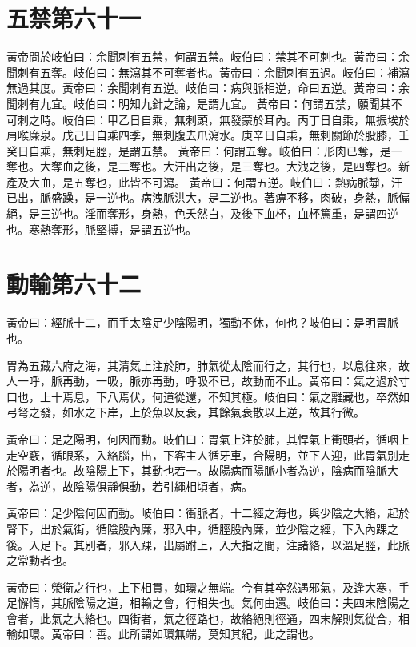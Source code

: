\section{五禁第六十一}

黃帝問於岐伯曰：余聞刺有五禁，何謂五禁。岐伯曰：禁其不可刺也。黃帝曰：余聞刺有五奪。岐伯曰：無瀉其不可奪者也。黃帝曰：余聞刺有五過。岐伯曰：補瀉無過其度。黃帝曰：余聞刺有五逆。岐伯曰：病與脈相逆，命曰五逆。黃帝曰：余聞刺有九宜。岐伯曰：明知九針之論，是謂九宜。
黃帝曰：何謂五禁，願聞其不可刺之時。岐伯曰：甲乙日自乘，無刺頭，無發蒙於耳內。丙丁日自乘，無振埃於肩喉廉泉。戊己日自乘四季，無刺腹去爪瀉水。庚辛日自乘，無刺關節於股膝，壬癸日自乘，無刺足脛，是謂五禁。
黃帝曰：何謂五奪。岐伯曰：形肉已奪，是一奪也。大奪血之後，是二奪也。大汗出之後，是三奪也。大洩之後，是四奪也。新產及大血，是五奪也，此皆不可瀉。
黃帝曰：何謂五逆。岐伯曰：熱病脈靜，汗已出，脈盛躁，是一逆也。病洩脈洪大，是二逆也。著痹不移，肉破，身熱，脈偏絕，是三逆也。淫而奪形，身熱，色夭然白，及後下血杯，血杯篤重，是謂四逆也。寒熱奪形，脈堅搏，是謂五逆也。

\section{動輸第六十二}

黃帝曰：經脈十二，而手太陰足少陰陽明，獨動不休，何也？岐伯曰：是明胃脈也。

胃為五藏六府之海，其清氣上注於肺，肺氣從太陰而行之，其行也，以息往來，故人一呼，脈再動，一吸，脈亦再動，呼吸不已，故動而不止。黃帝曰：氣之過於寸口也，上十焉息，下八焉伏，何道從還，不知其極。岐伯曰：氣之離藏也，卒然如弓弩之發，如水之下岸，上於魚以反衰，其餘氣衰散以上逆，故其行微。

黃帝曰：足之陽明，何因而動。岐伯曰：胃氣上注於肺，其悍氣上衝頭者，循咽上走空竅，循眼系，入絡腦，出，下客主人循牙車，合陽明，並下人迎，此胃氣別走於陽明者也。故陰陽上下，其動也若一。故陽病而陽脈小者為逆，陰病而陰脈大者，為逆，故陰陽俱靜俱動，若引繩相頃者，病。

黃帝曰：足少陰何因而動。岐伯曰：衝脈者，十二經之海也，與少陰之大絡，起於腎下，出於氣街，循陰股內廉，邪入中，循脛股內廉，並少陰之經，下入內踝之後。入足下。其別者，邪入踝，出屬跗上，入大指之間，注諸絡，以溫足脛，此脈之常動者也。

黃帝曰：滎衛之行也，上下相貫，如環之無端。今有其卒然遇邪氣，及逢大寒，手足懈惰，其脈陰陽之道，相輸之會，行相失也。氣何由還。岐伯曰：夫四末陰陽之會者，此氣之大絡也。四街者，氣之徑路也，故絡絕則徑通，四末解則氣從合，相輸如環。黃帝曰：善。此所謂如環無端，莫知其紀，此之謂也。



